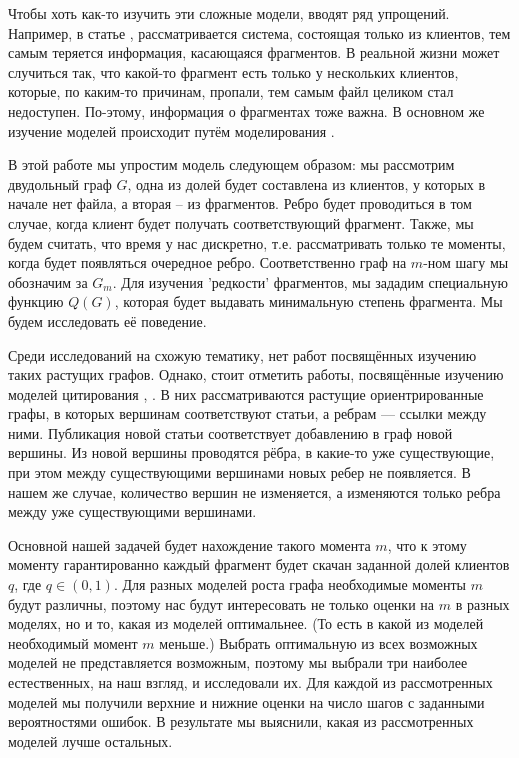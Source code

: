 \documentclass{matmex-diploma-custom}
\theoremstyle{named}
\begin{document}
Чтобы хоть как-то изучить эти сложные модели, вводят ряд упрощений.
Например, в статье \cite{cool}, рассматривается система, состоящая только из клиентов, 
тем самым теряется информация, касающаяся фрагментов.
В реальной жизни может случиться так, что какой-то фрагмент есть только у нескольких клиентов, которые, 
по каким-то причинам, пропали, тем самым файл целиком стал недоступен.
По-этому, информация о фрагментах тоже важна. 
В основном же изучение моделей происходит путём моделирования \cite{unavalib}.


В этой работе мы упростим модель следующем образом: мы рассмотрим двудольный граф $G$, 
одна из долей будет составлена из клиентов, у которых в начале нет файла, а вторая -- из фрагментов. 
Ребро будет проводиться в том случае, когда клиент будет получать соответствующий фрагмент.
Также, мы будем считать, что время у нас дискретно, т.е. рассматривать только те моменты, когда будет появляться очередное ребро.
Соответственно граф на $m$-ном шагу мы обозначим за $G_m$.
Для изучения 'редкости' фрагментов, мы зададим специальную функцию $Q(G)$, которая будет выдавать минимальную степень фрагмента.
Мы будем исследовать её поведение.

Среди исследований на схожую тематику, нет работ посвящённых изучению таких растущих графов.
Однако, стоит отметить работы, посвящённые изучению моделей цитирования \cite{price}, \cite{newman}. 
В них рассматриваются растущие ориентрированные графы, в которых вершинам соответствуют статьи, а ребрам --- ссылки между ними. 
Публикация новой статьи соответствует добавлению в граф новой вершины.
Из новой вершины проводятся рёбра, в какие-то уже существующие, при этом между существующими вершинами новых ребер не появляется.
В нашем же случае, количество вершин не изменяется, а изменяются только ребра между уже существующими вершинами.

Основной нашей задачей будет нахождение такого момента $m$, что к этому моменту гарантированно каждый фрагмент 
будет скачан заданной долей клиентов $q$, где $q \in (0, 1)$. 
Для разных моделей роста графа необходимые моменты $m$ будут различны, 
поэтому нас будут интересовать не только оценки на $m$ в разных моделях, но и то, какая из моделей оптимальнее. 
(То есть в какой из моделей необходимый момент $m$ меньше.) 
Выбрать оптимальную из всех возможных моделей не представляется возможным, 
поэтому мы выбрали три наиболее естественных, на наш взгляд, и исследовали их. 
Для каждой из рассмотренных моделей мы получили верхние и нижние оценки на число шагов с заданными вероятностями ошибок. 
В результате мы выяснили, какая из рассмотренных моделей лучше остальных.
\end{document}
